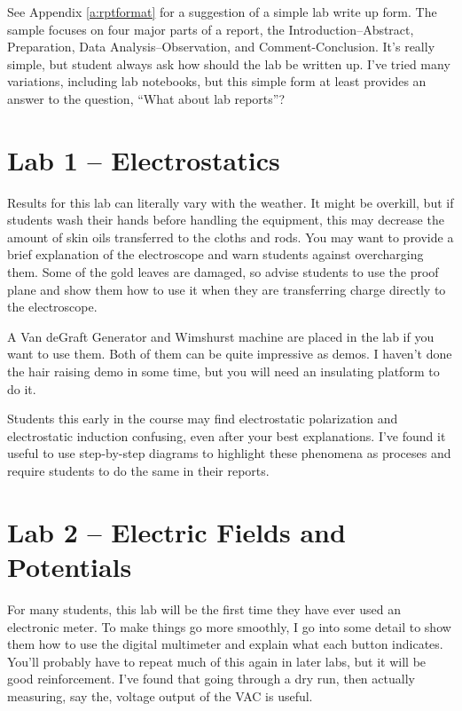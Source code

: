 See Appendix \ref{a:rptformat} for a suggestion of a simple lab write up form. The sample focuses on four major parts of a report, the Introduction--Abstract, Preparation, Data Analysis--Observation, and Comment-Conclusion. It's really simple, but student always ask how should the lab be written up. I've tried many variations, including lab notebooks, but this simple form at least provides an answer to the question, ``What about lab reports''?
\section{Lab 1 -- Electrostatics}
Results for this lab can literally vary with the weather. It might be overkill, but if students wash their hands before handling the equipment, this may decrease the amount of skin oils transferred to the cloths and rods. You may want to provide a brief explanation of the electroscope and warn students against overcharging them. Some of the gold leaves are damaged, so advise students to use the proof plane and show them how to use it when they are transferring charge directly to the electroscope.

A Van deGraft Generator and Wimshurst machine are placed in the lab if you want to use them. Both of them can be quite impressive as demos. I haven't done the hair raising demo in some time, but you will need an insulating platform to do it.

Students this early in the course may find electrostatic polarization and electrostatic induction confusing, even after your best explanations. I've found it useful to use step-by-step diagrams to highlight these phenomena as proceses and require students to do the same in their reports.

\section{Lab 2 -- Electric Fields and Potentials}
For many students, this lab will be the first time they have ever used an electronic meter. To make things go more smoothly, I go into some detail to show them how to use the digital multimeter and explain what each button indicates. You'll probably have to repeat much of this again in later labs, but it will be good reinforcement. I've found that going through a dry run, then actually measuring, say the, voltage output of the VAC is useful. 

